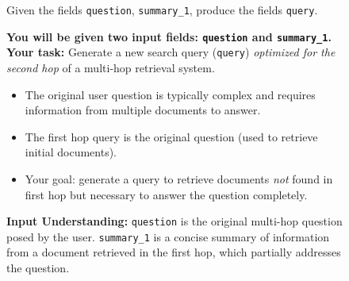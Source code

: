 \begin{figure}[!ht]
\centering
\begin{tcolorbox}[
    colback=promptbg!100!white,
    sharp corners=south, 
    boxrule=0.25mm, 
    fonttitle=\bfseries, 
    title={\textbf{Seed Prompt for Second-Hop of Multi-Hop QA System}}, 
    width=\textwidth, 
    enhanced,
    drop shadow
    ]
\scriptsize
\setlength{\parskip}{0pt}
\setlength{\itemsep}{0pt}

Given the fields \texttt{question}, \texttt{summary\_1}, produce the fields \texttt{query}.
\end{tcolorbox}

\begin{tcolorbox}[
    colback=promptbg!100!white, 
    sharp corners=south, 
    boxrule=0.3mm, 
    fonttitle=\bfseries, 
    title={\textbf{GEPA's Optimized Prompt for Second-Hop of Multi-Hop QA System, GPT-4.1 Mini}}, 
    width=\textwidth, 
    enhanced,
    drop shadow
    ]


\scriptsize
\textbf{You will be given two input fields: \texttt{question} and \texttt{summary\_1}.} \textbf{Your task:} Generate a new search query (\texttt{query}) \emph{optimized for the second hop} of a multi-hop retrieval system.

\begin{itemize}[left=0em]
    \item The original user question is typically complex and requires information from multiple documents to answer.
    \item The first hop query is the original question (used to retrieve initial documents).
    \item Your goal: generate a query to retrieve documents \emph{not} found in first hop but necessary to answer the question completely.
\end{itemize}

\vspace{1mm}
\textbf{Input Understanding:} \texttt{question} is the original multi-hop question posed by the user. \texttt{summary\_1} is a concise summary of information from a document retrieved in the first hop, which partially addresses the question.


\end{tcolorbox}
\end{figure}
